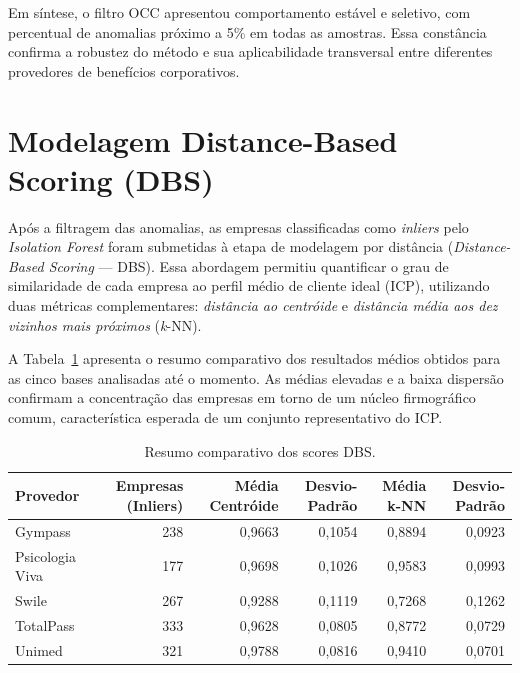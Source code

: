 
Em síntese, o filtro OCC apresentou comportamento estável e seletivo, com percentual de anomalias próximo a 5\% em todas as amostras. Essa constância confirma a robustez do método e sua aplicabilidade transversal entre diferentes provedores de benefícios corporativos.


\section{Modelagem Distance-Based Scoring (DBS)}

Após a filtragem das anomalias, as empresas classificadas como \textit{inliers} pelo \textit{Isolation Forest} foram submetidas à etapa de modelagem por distância (\textit{Distance-Based Scoring} — DBS). Essa abordagem permitiu quantificar o grau de similaridade de cada empresa ao perfil médio de cliente ideal (ICP), utilizando duas métricas complementares: \textit{distância ao centróide} e \textit{distância média aos dez vizinhos mais próximos} (\textit{k}-NN).

A Tabela~\ref{tab:7_5_dbs_all} apresenta o resumo comparativo dos resultados médios obtidos para as cinco bases analisadas até o momento. As médias elevadas e a baixa dispersão confirmam a concentração das empresas em torno de um núcleo firmográfico comum, característica esperada de um conjunto representativo do ICP.

\begin{table}[H]
\centering
\caption{Resumo comparativo dos scores DBS.}
\label{tab:7_5_dbs_all}
\begin{tabular}{lrrrrr}
\toprule
\textbf{Provedor} & \textbf{Empresas (Inliers)} & \textbf{Média Centróide} & \textbf{Desvio-Padrão} & \textbf{Média k-NN} & \textbf{Desvio-Padrão} \\
\midrule
Gympass & 238 & 0,9663 & 0,1054 & 0,8894 & 0,0923 \\
Psicologia Viva & 177 & 0,9698 & 0,1026 & 0,9583 & 0,0993 \\
Swile & 267 & 0,9288 & 0,1119 & 0,7268 & 0,1262 \\
TotalPass & 333 & 0,9628 & 0,0805 & 0,8772 & 0,0729 \\
Unimed & 321 & 0,9788 & 0,0816 & 0,9410 & 0,0701 \\
\bottomrule
\end{tabular}
\end{table}

